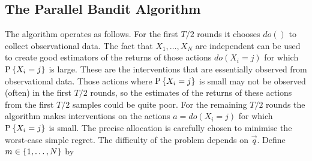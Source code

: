 


\subsection{The Parallel Bandit Algorithm}
\label{sub:par-bandit-alg}

The algorithm operates as follows. For the first $T/2$ rounds it chooses $do()$ to collect observational data.
The fact that $X_1,\ldots,X_N$ are independent can be used to create good estimators of the returns of those
actions $do(X_i = j)$ for which $\P{X_i = j}$ is large. These are the interventions that are essentially observed
from observational data. Those actions where $\P{X_i = j}$ is small may not be observed (often) in the first $T/2$ rounds, so
the estimates of the returns of these actions from the first $T/2$ samples could be quite poor. For the remaining $T/2$ rounds
the algorithm makes interventions on the actions $a = do(X_i = j)$ for which $\P{X_i = j}$ is small. The precise allocation is
carefully chosen to minimise the worst-case simple regret. The difficulty of the problem depends on $\vec{q}$. 
Define $m \in \set{1, \ldots, N}$ by

